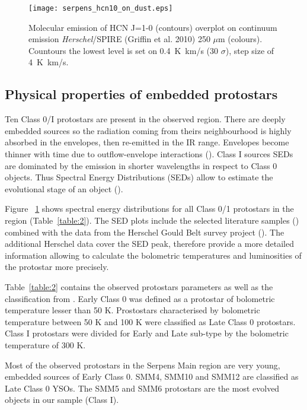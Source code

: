 \documentclass{aa}
\begin{document}
\begin{figure}
   \texttt{[image: serpens\_hcn10\_on\_dust.eps]}
      \caption{Molecular emission of HCN J=1-0 (contours) overplot on continuum emission \textit{Herschel}/SPIRE (Griffin et al. 2010) 250 $\mu$m (colours). Countours the lowest level is set on 0.4~K~km/s (30 $\sigma$), step size of 4~K~km/s.}
         \label{seds}
   \end{figure}



\subsection{Physical properties of embedded protostars}

Ten Class 0/I protostars are present in the observed region. There are deeply embedded sources so the radiation coming from theirs neighbourhood is highly absorbed in the envelopes, then re-emitted in the IR range. Envelopes become thinner with time due to outflow-envelope interactions (\citealt{Arc06}). Class I sources SEDs are dominated by the emission in shorter wavelengths in respect to Class 0 objects. Thus Spectral Energy Distributions (SEDs) allow to estimate the evolutional stage of an object (\citealt{And93}). 

Figure ~\ref{seds} shows spectral energy distributions for all Class 0/1 protostars in the region (Table~\ref{table:2}). The SED plots include the selected literature samples (\citealt{Dun15}) combined with the data from the Herschel Gould Belt survey project (\citealt{And10}). The additional Herschel data cover the SED peak, therefore provide a more detailed information allowing to calculate the bolometric temperatures and luminosities of the protostar more precisely.

Table~\ref{table:2} contains the observed protostars parameters as well as the classification from \citealt{Eno09}. Early Class 0 was defined as a protostar of bolometric temperature lesser than 50 K. Prostostars characterised by bolometric temperature between 50 K and 100 K were classified as Late Class 0 protostars. Class I protostars were divided for Early and Late sub-type by the bolometric temperature of 300 K.

Most of the observed protostars in the Serpens Main region are very young, embedded sources of Early Class 0. SMM4, SMM10 and SMM12 are classified as Late Class 0 YSOs. The SMM5 and SMM6 protostars are the most evolved objects in our sample (Class I). 
\end{document}
